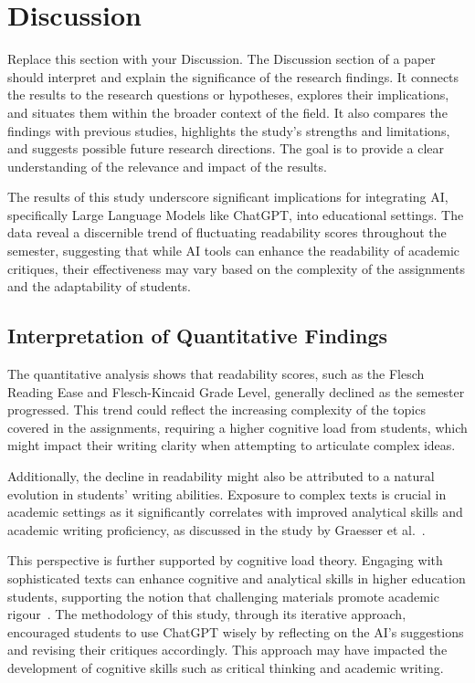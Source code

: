 \section{Discussion}
\label{Discussion}

Replace this section with your Discussion.  The Discussion section of a paper should interpret and explain the significance of the research findings. It connects the results to the research questions or hypotheses, explores their implications, and situates them within the broader context of the field. It also compares the findings with previous studies, highlights the study’s strengths and limitations, and suggests possible future research directions. The goal is to provide a clear understanding of the relevance and impact of the results.

The results of this study underscore significant implications for integrating AI, specifically Large Language Models like ChatGPT, into educational settings. The data reveal a discernible trend of fluctuating readability scores throughout the semester, suggesting that while AI tools can enhance the readability of academic critiques, their effectiveness may vary based on the complexity of the assignments and the adaptability of students.

\subsection{Interpretation of Quantitative Findings}
The quantitative analysis shows that readability scores, such as the Flesch Reading Ease and Flesch-Kincaid Grade Level, generally declined as the semester progressed. This trend could reflect the increasing complexity of the topics covered in the assignments, requiring a higher cognitive load from students, which might impact their writing clarity when attempting to articulate complex ideas.

Additionally, the decline in readability might also be attributed to a natural evolution in students' writing abilities. Exposure to complex texts is crucial in academic settings as it significantly correlates with improved analytical skills and academic writing proficiency, as discussed in the study by Graesser et al.~\cite{graesser_2011_cohmetrix}.

This perspective is further supported by cognitive load theory. Engaging with sophisticated texts can enhance cognitive and analytical skills in higher education students, supporting the notion that challenging materials promote academic rigour~\cite{chall_1995_readability}. The methodology of this study, through its iterative approach, encouraged students to use ChatGPT wisely by reflecting on the AI's suggestions and revising their critiques accordingly. This approach may have impacted the development of cognitive skills such as critical thinking and academic writing.

